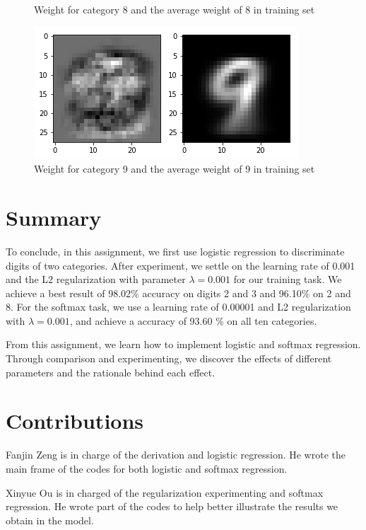 \documentclass{article}
\begin{document}
\begin{figure}[thbp]
\begin{minipage}{0.48\textwidth}
		\caption{Weight for category 8 and the average weight of 8 in training set}
	\end{minipage}\hfill
	\begin {minipage}{0.48\textwidth}
	\centering
	\includegraphics[width=\textwidth]{pics/9.png}
	\caption{Weight for category 9 and the average weight of 9 in training set}
\end{minipage}
\end{figure}

\newpage
\section{Summary}
To conclude, in this assignment, we first use logistic regression to discriminate digits of two categories. After experiment, we settle on the learning rate of 0.001 and the L2 regularization with parameter $\lambda = 0.001$ for our training task. We achieve a best result of 98.02\% accuracy on digits 2 and 3 and 96.10\% on 2 and 8. For the softmax task, we use a learning rate of 0.00001 and L2 regularization with  $\lambda = 0.001$, and achieve a accuracy of 93.60 \% on all ten categories.

From this assignment, we learn how to implement logistic and softmax regression. Through comparison and experimenting, we discover the effects of different parameters and the rationale behind each effect. 
\section{Contributions}
Fanjin Zeng is in charge of the derivation and logistic regression. He wrote the main frame of the codes for both logistic and softmax regression. 

Xinyue Ou is in charged of the regularization experimenting and softmax regression. He wrote part of the codes to help better illustrate the results we obtain in the model.
\end{document}
